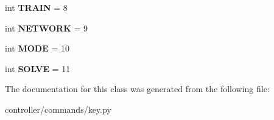 \begin{DoxyCompactItemize}
\mbox{\label{classmodules_1_1controller_1_1commands_1_1key_1_1_key_a1d695ed554375bc23fd3c06295bd5158}} 
int {\bfseries T\+R\+A\+IN} = 8
\item 
\mbox{\label{classmodules_1_1controller_1_1commands_1_1key_1_1_key_a021f1becc3fdebde37afae78ab7fe4e1}} 
int {\bfseries N\+E\+T\+W\+O\+RK} = 9
\item 
\mbox{\label{classmodules_1_1controller_1_1commands_1_1key_1_1_key_a2e789e8e45efb4665b84ccf642447f76}} 
int {\bfseries M\+O\+DE} = 10
\item 
\mbox{\label{classmodules_1_1controller_1_1commands_1_1key_1_1_key_a73d5df57b028c18cdd0738664226cf82}} 
int {\bfseries S\+O\+L\+VE} = 11
\end{DoxyCompactItemize}


The documentation for this class was generated from the following file\+:\begin{DoxyCompactItemize}
\item 
controller/commands/key.\+py\end{DoxyCompactItemize}
